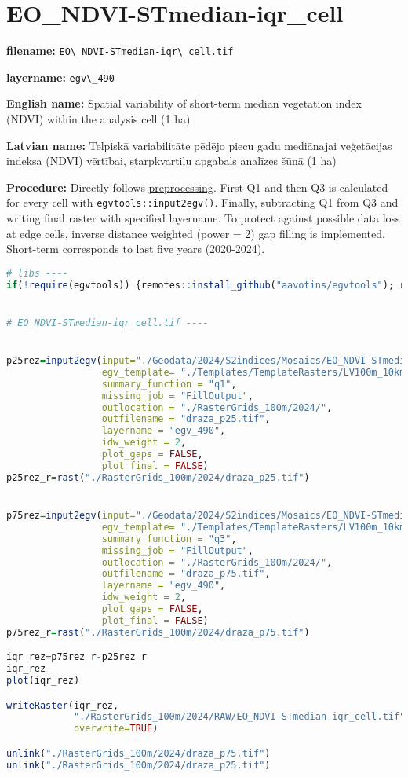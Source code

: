 \documentclass[
]{book}
\newcommand{\passthrough}[1]{#1}
\begin{document}
\section{EO\_NDVI-STmedian-iqr\_cell}\label{ch06.490}

\textbf{filename:} \passthrough{\lstinline!EO\_NDVI-STmedian-iqr\_cell.tif!}

\textbf{layername:} \passthrough{\lstinline!egv\_490!}

\textbf{English name:} Spatial variability of short-term median vegetation index (NDVI) within the analysis cell (1 ha)

\textbf{Latvian name:} Telpiskā variabilitāte pēdējo piecu gadu mediānajai veģetācijas indeksa (NDVI) vērtībai, starpkvartiļu apgabals analīzes šūnā (1 ha)

\textbf{Procedure:} Directly follows \hyperref[Ch04.13]{preprocessing}. First Q1 and then Q3
is calculated for every cell with \passthrough{\lstinline!egvtools::input2egv()!}. Finally, subtracting
Q1 from Q3 and writing final raster with specified layername. To protect against possible data loss at edge cells,
inverse distance weighted (power = 2) gap filling is implemented. Short-term corresponds
to last five years (2020-2024).

\begin{lstlisting}[language=R]
# libs ----
if(!require(egvtools)) {remotes::install_github("aavotins/egvtools"); require(egvtools)}


# EO_NDVI-STmedian-iqr_cell.tif ----


p25rez=input2egv(input="./Geodata/2024/S2indices/Mosaics/EO_NDVI-STmedian.tif",
                 egv_template= "./Templates/TemplateRasters/LV100m_10km.tif",
                 summary_function = "q1",
                 missing_job = "FillOutput",
                 outlocation = "./RasterGrids_100m/2024/",
                 outfilename = "draza_p25.tif",
                 layername = "egv_490",
                 idw_weight = 2,
                 plot_gaps = FALSE,
                 plot_final = FALSE)
p25rez_r=rast("./RasterGrids_100m/2024/draza_p25.tif")


p75rez=input2egv(input="./Geodata/2024/S2indices/Mosaics/EO_NDVI-STmedian.tif",
                 egv_template= "./Templates/TemplateRasters/LV100m_10km.tif",
                 summary_function = "q3",
                 missing_job = "FillOutput",
                 outlocation = "./RasterGrids_100m/2024/",
                 outfilename = "draza_p75.tif",
                 layername = "egv_490",
                 idw_weight = 2,
                 plot_gaps = FALSE,
                 plot_final = FALSE)
p75rez_r=rast("./RasterGrids_100m/2024/draza_p75.tif")

iqr_rez=p75rez_r-p25rez_r
iqr_rez
plot(iqr_rez)

writeRaster(iqr_rez,
            "./RasterGrids_100m/2024/RAW/EO_NDVI-STmedian-iqr_cell.tif",
            overwrite=TRUE)

unlink("./RasterGrids_100m/2024/draza_p75.tif")
unlink("./RasterGrids_100m/2024/draza_p25.tif")
\end{lstlisting}
\end{document}
